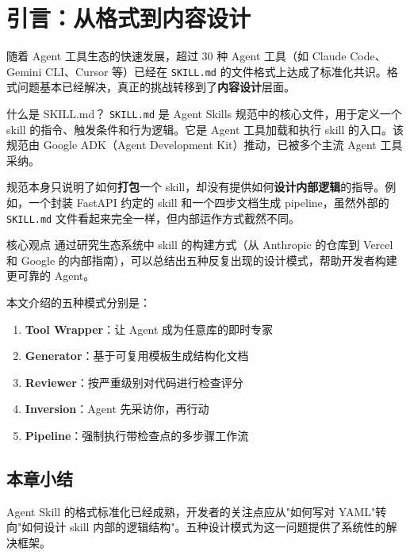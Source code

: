 \section{引言：从格式到内容设计}

随着 Agent 工具生态的快速发展，超过 30 种 Agent 工具（如 Claude Code、Gemini CLI、Cursor 等）已经在 \texttt{SKILL.md} 的文件格式上达成了标准化共识。格式问题基本已经解决，真正的挑战转移到了\textbf{内容设计}层面。

\begin{knowledgebox}{什么是 SKILL.md？}
\texttt{SKILL.md} 是 Agent Skills 规范中的核心文件，用于定义一个 skill 的指令、触发条件和行为逻辑。它是 Agent 工具加载和执行 skill 的入口。该规范由 Google ADK（Agent Development Kit）推动，已被多个主流 Agent 工具采纳。
\end{knowledgebox}

规范本身只说明了如何\textbf{打包}一个 skill，却没有提供如何\textbf{设计内部逻辑}的指导。例如，一个封装 FastAPI 约定的 skill 和一个四步文档生成 pipeline，虽然外部的 \texttt{SKILL.md} 文件看起来完全一样，但内部运作方式截然不同。

\begin{importantbox}{核心观点}
通过研究生态系统中 skill 的构建方式（从 Anthropic 的仓库到 Vercel 和 Google 的内部指南），可以总结出五种反复出现的设计模式，帮助开发者构建更可靠的 Agent。
\end{importantbox}

本文介绍的五种模式分别是：
\begin{enumerate}
    \item \textbf{Tool Wrapper}：让 Agent 成为任意库的即时专家
    \item \textbf{Generator}：基于可复用模板生成结构化文档
    \item \textbf{Reviewer}：按严重级别对代码进行检查评分
    \item \textbf{Inversion}：Agent 先采访你，再行动
    \item \textbf{Pipeline}：强制执行带检查点的多步骤工作流
\end{enumerate}

\subsection{本章小结}

Agent Skill 的格式标准化已经成熟，开发者的关注点应从"如何写对 YAML"转向"如何设计 skill 内部的逻辑结构"。五种设计模式为这一问题提供了系统性的解决框架。

